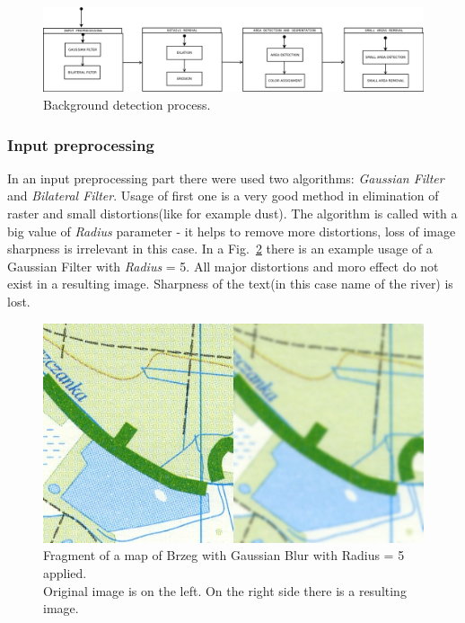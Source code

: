\documentclass[a4paper,onecolumn,oneside,12pt]{memoir}
\begin{document}
\begin{figure}[!ht]
\begin{center}
\includegraphics[scale=0.3]{images/backgroundDetection.png}
\caption{Background detection process.}
\label{backgroundDetectionImage}
\end{center}
\end{figure}

\subsubsection{Input preprocessing}

In an input preprocessing part there were used two algorithms: \textit{Gaussian Filter} and \textit{
Bilateral Filter}. Usage of first one is a very good method in elimination of raster and small
distortions(like for example dust). The algorithm is called with a big value of \textit{Radius}
parameter - it helps to remove more distortions, loss of image sharpness is irrelevant in this
case. In a Fig.~\ref{gaussianBlurResult} there is an example usage of a Gaussian Filter with 
\textit{Radius} = 5. All major distortions and moro effect do not exist in a resulting image.
Sharpness of the text(in this case name of the river) is lost.

\begin{figure}[!ht]
\begin{center}
\includegraphics[scale=3.0]{images/GaussianBlurResult.jpg}
\caption{Fragment of a map of Brzeg with Gaussian Blur with Radius = 5 applied. \\ 
Original image is on the left. On the right side there is a resulting image.}
\label{gaussianBlurResult}
\end{center}
\end{figure}
\end{document}
